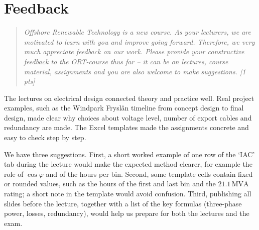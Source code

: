 \section{Feedback}
\label{sec:elec-feedback}
\begin{quote}
\emph{Offshore Renewable Technology is a new course. As your lecturers, we are motivated to learn with you and improve going forward. Therefore, we very much appreciate feedback on our work. Please provide your constructive feedback to the ORT-course thus far -- it can be on lectures, course material, assignments and you are also welcome to make suggestions. [1 pts]}
\end{quote}

The lectures on electrical design connected theory and practice well. Real project examples, such as the Windpark Fryslân timeline from concept design to final design, made clear why choices about voltage level, number of export cables and redundancy are made. The Excel templates made the assignments concrete and easy to check step by step.

We have three suggestions. First, a short worked example of one row of the `IAC' tab during the lecture would make the expected method clearer, for example the role of $\cos\varphi$ and of the hours per bin. Second, some template cells contain fixed or rounded values, such as the hours of the first and last bin and the $21.1\,\mathrm{MVA}$ rating; a short note in the template would avoid confusion. Third, publishing all slides before the lecture, together with a list of the key formulas (three-phase power, losses, redundancy), would help us prepare for both the lectures and the exam.
